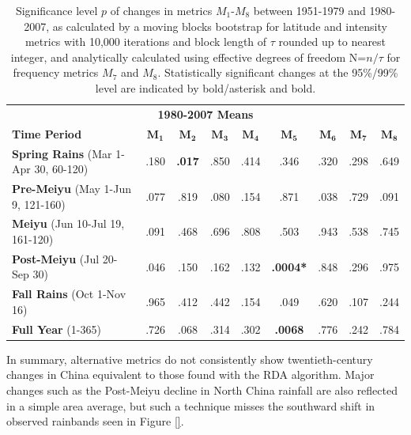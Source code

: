 \begin{table}[p]

\centering

\caption{Significance level $p$ of changes in metrics $M_1$-$M_8$ between 1951-1979 and 1980-2007, as calculated by a moving blocks bootstrap for latitude and intensity metrics with 10,000 iterations and block length of $\tau$ rounded up to nearest integer, and analytically calculated using effective degrees of freedom N=$n/\tau$ for frequency metrics $M_7$ and $M_8$. Statistically significant changes at the 95\%/99\% level are indicated by bold/asterisk and bold.}

\begin{tabular}{ l c c c c c c c c}
	 \multicolumn{9}{c}{\textbf{1980-2007 Means}} \\
	 \textbf{Time Period} 						& $\boldsymbol{M_1}$ & $\boldsymbol{M_2}$ & $\boldsymbol{M_3}$ & $\boldsymbol{M_4}$ & $\boldsymbol{M_5}$ & $\boldsymbol{M_6}$ & $\boldsymbol{M_7}$ & $\boldsymbol{M_8}$ \\	 \hline
	 \hline
	\textbf{Spring Rains} (Mar 1-Apr 30, 60-120) 	& .180 & \textbf{.017} 	& .850 & .414 	& .346 			& .320 & .298 & .649 \\
	\textbf{Pre-Meiyu} (May 1-Jun 9, 121-160) 		& .077 & .819 			& .080 & .154 & .871 			& .038 & .729 & .091 \\		
	\textbf{Meiyu} (Jun 10-Jul 19, 161-120) 		& .091 & .468 			& .696 & .808 & .503 			& .943 & .538 & .745 \\
	\textbf{Post-Meiyu} (Jul 20-Sep 30) 			& .046 & .150 			& .162 & .132 & \textbf{.0004*} 	& .848 & .296 & .975 \\
	\textbf{Fall Rains} (Oct 1-Nov 16) 				& .965 & .412 			& .442 & .154 & .049 			& .620 & .107 & .244 \\
	\textbf{Full Year} (1-365)	 				& .726 & .068 			& .314 & .302 & \textbf{.0068} 	& .776 & .242 & .784 \\
	
\end{tabular}
\label{ts12}
\end{table}

In summary, alternative metrics do not consistently show twentieth-century changes in China equivalent to those found with the RDA algorithm. Major changes such as the Post-Meiyu decline in North China rainfall are also reflected in a simple area average, but such a technique misses the southward shift in observed rainbands seen in Figure \ref{}. 



